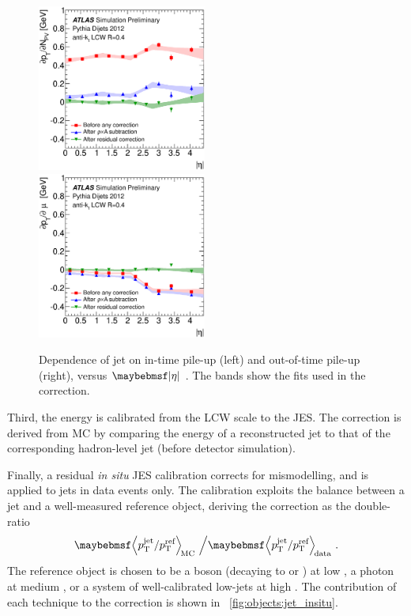 \begin{description}
	\begin{figure}
		\includegraphics[width=0.495\textwidth]{tex/selection/jet_pu_npv}
		\hfill
		\includegraphics[width=0.495\textwidth]{tex/selection/jet_pu_mu}
		\caption{Dependence of jet \pt on in-time pile-up (left) and out-of-time pile-up 
		(right), versus $\mods{\eta}$ \cite{Jets:PileupCorrection:2012}. The bands show 
		the fits used in the correction.}
		\label{fig:objects:jet_pu_corr}
	\end{figure}

	Third, the energy is calibrated from the LCW scale to the \ac{JES}. The correction is 
	derived from MC by comparing the energy of a reconstructed jet to that of the 
	corresponding hadron-level jet (\ie before detector simulation).

	Finally, a residual \textit{in situ} \ac{JES} calibration corrects for mismodelling, 
	and is applied to jets in data events only. The calibration exploits the \pt 
	balance between a jet and a well-measured reference object, deriving the correction 
	as the double-ratio
	\begin{equation}
		\angles{p_{\text{T}}^{\text{jet}} / p_{\text{T}}^{\text{ref}}}_{\text{\!MC}} 
		\,\, \Big/ 
		\angles{p_{\text{T}}^{\text{jet}} / p_{\text{T}}^{\text{ref}}}_{\text{\!data}} 
		\,\,.
	\end{equation}
	The reference object is chosen to be a \PZ boson (decaying to \epluseminus or 
	\HepProcess{\APmuon\Pmuon}) at low \pt, a photon at medium \pt, or a system of 
	well-calibrated low-\pt jets at high \pt. The contribution of each technique to 
	the correction is shown in \Figure~\ref{fig:objects:jet_insitu}.


\end{description}
